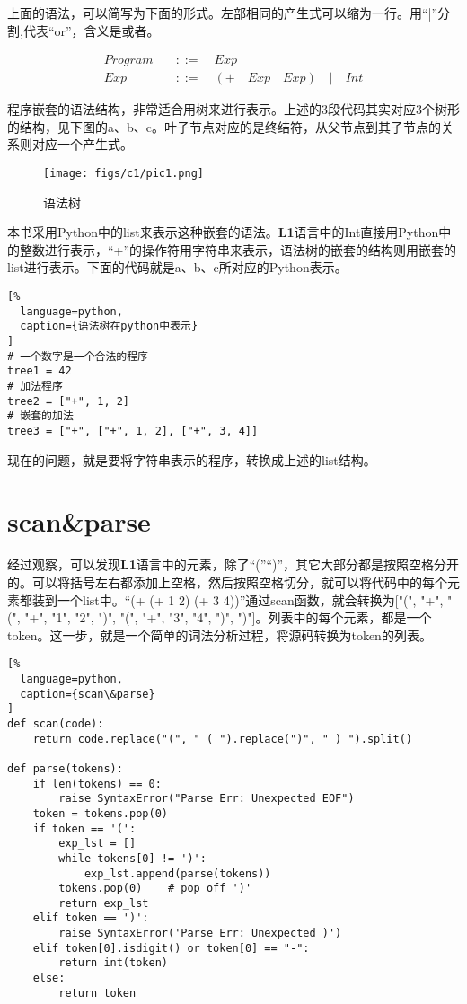 上面的语法，可以简写为下面的形式。左部相同的产生式可以缩为一行。用“|”分割,代表“or”，含义是或者。

\begin{equation}
\begin{aligned}
  \label{eq:2}
   Program \quad &::= \quad Exp \\
   Exp \quad &::= \quad (+ \quad Exp \quad Exp) \quad | \quad Int
\end{aligned}
\end{equation}

程序嵌套的语法结构，非常适合用树来进行表示。上述的3段代码其实对应3个树形的结构，见下图的a、b、c。叶子节点对应的是终结符，从父节点到其子节点的关系则对应一个产生式。

\begin{figure}[ht]
\centering
\texttt{[image: figs/c1/pic1.png]}
\caption{语法树}
\label{fig:fig1}
\end{figure}

本书采用Python中的list来表示这种嵌套的语法。\textbf{L1}语言中的Int直接用Python中的整数进行表示，“+”的操作符用字符串来表示，语法树的嵌套的结构则用嵌套的list进行表示。下面的代码就是a、b、c所对应的Python表示。

\begin{lstlisting}[%
  language=python,
  caption={语法树在python中表示}
]
# 一个数字是一个合法的程序
tree1 = 42
# 加法程序
tree2 = ["+", 1, 2]
# 嵌套的加法
tree3 = ["+", ["+", 1, 2], ["+", 3, 4]]
\end{lstlisting}

现在的问题，就是要将字符串表示的程序，转换成上述的list结构。


\section{scan\&parse}

经过观察，可以发现\textbf{L1}语言中的元素，除了“(”“)”，其它大部分都是按照空格分开的。可以将括号左右都添加上空格，然后按照空格切分，就可以将代码中的每个元素都装到一个list中。“(+ (+ 1 2) (+ 3 4))”通过scan函数，就会转换为["(", "+", "(", "+", "1", "2", ")", "(", "+", "3", "4", ")", ")"]。列表中的每个元素，都是一个token。这一步，就是一个简单的词法分析过程，将源码转换为token的列表。

\begin{lstlisting}[%
  language=python,
  caption={scan\&parse}
]
def scan(code):
    return code.replace("(", " ( ").replace(")", " ) ").split()

def parse(tokens):
    if len(tokens) == 0:
        raise SyntaxError("Parse Err: Unexpected EOF")
    token = tokens.pop(0)
    if token == '(':
        exp_lst = []
        while tokens[0] != ')':
            exp_lst.append(parse(tokens))
        tokens.pop(0)    # pop off ')'
        return exp_lst
    elif token == ')':
        raise SyntaxError('Parse Err: Unexpected )')
    elif token[0].isdigit() or token[0] == "-":
        return int(token)
    else:
        return token
\end{lstlisting}

